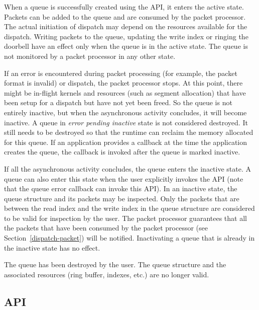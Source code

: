 \documentclass[final]{book}
\begin{document}
\begin{description}[itemsep=1pt,leftmargin=0cm, labelindent=0cm]
\item[Active] When a queue is successfully created using the
   API, it enters the active state. Packets can be
  added to the queue and are consumed by the packet processor. The actual
  initiation of dispatch may depend on the resources available for the
  dispatch. Writing packets to the queue, updating the write index or ringing
  the doorbell have an effect only when the queue is in the active state. The
  queue is not monitored by a packet processor in any other state.
\item[Error pending inactive] If an error is encountered during packet
  processing (for example, the packet format is invalid) or dispatch, the packet
  processor stops. At this point, there might be in-flight kernels and resources
  (such as segment allocation) that have been setup for a dispatch but have not
  yet been freed. So the queue is not entirely inactive, but when the
  asynchronous activity concludes, it will become inactive. A queue in
  \emph{error pending inactive} state is not considered destroyed. It still
  needs to be destroyed so that the runtime can reclaim the memory allocated for
  this queue. If an application provides a callback at the time the application
  creates the queue, the callback is invoked after the queue is marked inactive.
\item[Inactive] If all the asynchronous activity concludes, the queue enters the
  inactive state. A queue can also enter this state when the user explicitly
  invokes the  API (note that the queue error
  callback can invoke this API). In an inactive state, the queue structure and
  its packets may be inspected. Only the packets that are between the read index
  and the write index in the queue structure are considered to be valid for
  inspection by the user. The packet processor guarantees that all the packets
  that have been consumed by the packet processor (see
  Section~\ref{dispatch-packet}) will be notified.  Inactivating a queue that is
  already in the inactive state has no effect.
\item[Destroyed] The queue has been destroyed by the user. The queue structure
  and the associated resources (ring buffer, indexes, etc.) are no longer valid.
\end{description}

\subsection{API}

\end{document}
